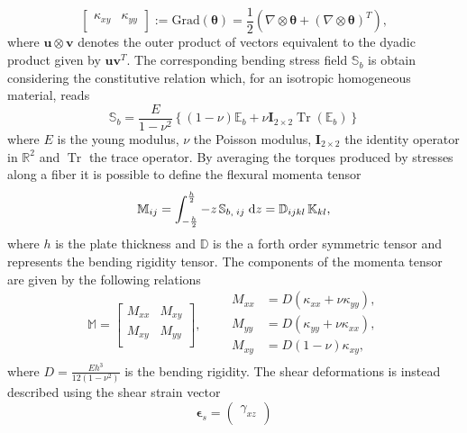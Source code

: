 \documentclass[preprint,12pt]{elsarticle}
\DeclareMathOperator{\Tr}{Tr}
\begin{document}
{\begin{equation}
\begin{bmatrix}
\kappa_{xy} & \kappa_{yy} \\
\end{bmatrix} := \mathrm{Grad}(\bm{\theta}) =  \frac{1}{2} \left(\nabla \otimes \bm{\theta} + \left(\nabla \otimes \bm{\theta}\right)^T \right),
\end{equation}
where $\bm{u} \otimes {\bm{v}}$ denotes the outer product of vectors equivalent to the dyadic product given by $\bm{u}\bm{v}^T$. The corresponding bending  stress field $\mathbb{S}_b$ is obtain considering the constitutive relation which, for an isotropic homogeneous material, reads
\begin{equation}
	\mathbb{S}_{b} = \frac{E}{1-\nu^2} \left\{ (1-\nu) \mathbb{E}_b +\nu \bm{I}_{2 \times 2} \Tr(\mathbb{E}_b) \right\}
\end{equation}
where $E$ is the young modulus, $\nu$ the Poisson modulus, $\bm{I}_{2 \times 2}$ the identity operator in $\mathbb{R}^2$ and $\Tr$ the trace operator. By averaging the torques produced by stresses along a fiber it is possible to define the flexural momenta tensor
\begin{equation}
\mathbb{M}_{ij} = \int_{-\frac{h}{2} }^{ \frac{h}{2} } -z \, \mathbb{S}_{b, \; ij} \d z = \mathbb{D}_{ijkl} \,  \mathbb{K}_{kl}, 
\end{equation}
where $h$ is the plate thickness and $\mathbb{D}$ is the a forth order symmetric tensor and represents the bending rigidity tensor. The components of the momenta tensor are given by the following relations 
\begin{equation}
	\mathbb{M} = \begin{bmatrix}
	M_{xx} &  M_{xy}\\
	M_{xy} &  M_{yy} \\
	\end{bmatrix},  \qquad 
	\begin{aligned}
	M_{xx} &= D\left(\kappa_{xx} + \nu \kappa_{yy} \right),\\
	M_{yy} &= D\left(\kappa_{yy} + \nu \kappa_{xx} \right),\\
	M_{xy} &= D\left(1 - \nu \right) \kappa_{xy}, \\
	\end{aligned} 
\end{equation}
where $D = \frac{E h^3}{12 (1 - \nu^2)}$ is the bending rigidity. The shear deformations is instead described using the shear strain vector
\begin{equation}	
\bm{\epsilon}_s = 
\begin{pmatrix}
\gamma_{xz} \\

\end{pmatrix}
\end{equation}}
\end{document}

